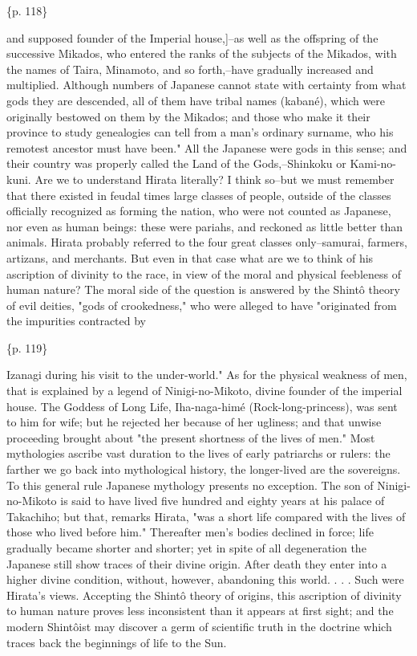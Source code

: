\{p. 118\}

and supposed founder of the Imperial house,]--as well as the offspring of the successive Mikados, who entered the ranks of the subjects of the Mikados, with the names of Taira, Minamoto, and so forth,--have gradually increased and multiplied. Although numbers of Japanese cannot state with certainty from what gods they are descended, all of them have tribal names (kabané), which were originally bestowed on them by the Mikados; and those who make it their province to study genealogies can tell from a man's ordinary surname, who his remotest ancestor must have been." All the Japanese were gods in this sense; and their country was properly called the Land of the Gods,--Shinkoku or Kami-no-kuni. Are we to understand Hirata literally? I think so--but we must remember that there existed in feudal times large classes of people, outside of the classes officially recognized as forming the nation, who were not counted as Japanese, nor even as human beings: these were pariahs, and reckoned as little better than animals. Hirata probably referred to the four great classes only--samurai, farmers, artizans, and merchants. But even in that case what are we to think of his ascription of divinity to the race, in view of the moral and physical feebleness of human nature? The moral side of the question is answered by the Shintô theory of evil deities, "gods of crookedness," who were alleged to have "originated from the impurities contracted by

\{p. 119\}

Izanagi during his visit to the under-world." As for the physical weakness of men, that is explained by a legend of Ninigi-no-Mikoto, divine founder of the imperial house. The Goddess of Long Life, Iha-naga-himé (Rock-long-princess), was sent to him for wife; but he rejected her because of her ugliness; and that unwise proceeding brought about "the present shortness of the lives of men." Most mythologies ascribe vast duration to the lives of early patriarchs or rulers: the farther we go back into mythological history, the longer-lived are the sovereigns. To this general rule Japanese mythology presents no exception. The son of Ninigi-no-Mikoto is said to have lived five hundred and eighty years at his palace of Takachiho; but that, remarks Hirata, "was a short life compared with the lives of those who lived before him." Thereafter men's bodies declined in force; life gradually became shorter and shorter; yet in spite of all degeneration the Japanese still show traces of their divine origin. After death they enter into a higher divine condition, without, however, abandoning this world. . . . Such were Hirata's views. Accepting the Shintô theory of origins, this ascription of divinity to human nature proves less inconsistent than it appears at first sight; and the modern Shintôist may discover a germ of scientific truth in the doctrine which traces back the beginnings of life to the Sun.

